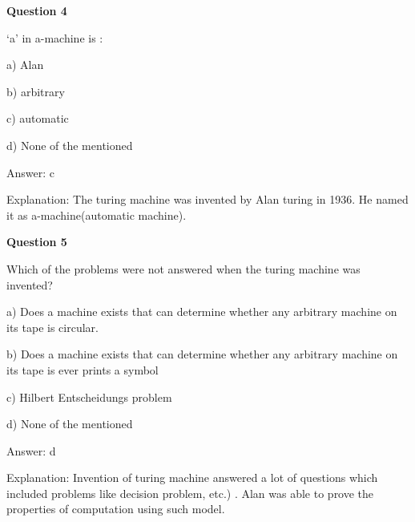 \documentclass{article}
\begin{document}
\begin{mdframed}[linewidth=1pt, roundcorner=5pt, linecolor=gray!30, backgroundcolor=gray!5]
\textbf{Question 4} 

‘a' in a-machine is :

a) Alan

b) arbitrary

c) automatic

d) None of the mentioned
\vspace{5pt} \par
\begin{tcolorbox}[colback=green!5, colframe=green!40!black, title=Solution]
Answer: c

Explanation: The turing machine was invented by Alan turing in 1936. He named it as a-machine(automatic machine).
\end{tcolorbox}
\end{mdframed}

\begin{mdframed}[linewidth=1pt, roundcorner=5pt, linecolor=gray!30, backgroundcolor=gray!5]
\textbf{Question 5} 

Which of the problems were not answered when the turing machine was invented?

a) Does a machine exists that can determine whether any arbitrary machine on its tape is circular.

b) Does a machine exists that can determine whether any arbitrary machine on its tape is ever prints a symbol

c) Hilbert Entscheidungs problem

d) None of the mentioned
\vspace{5pt} \par
\begin{tcolorbox}[colback=green!5, colframe=green!40!black, title=Solution]
Answer: d

Explanation: Invention of turing machine answered a lot of questions which included problems like decision problem, etc.) . Alan was able to prove the properties of computation using such model.
\end{tcolorbox}
\end{mdframed}
\end{document}
